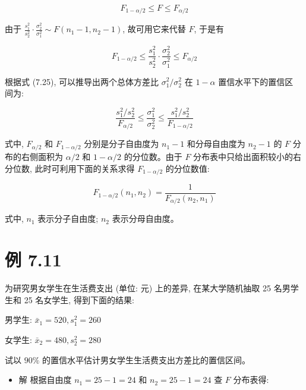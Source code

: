 \documentclass[10pt]{article}
\begin{document}
\begin{CJK*}{UTF8}{bsmi}
\begin{equation*}
F_{1-\alpha / 2} \leqslant F \leqslant F_{\alpha / 2} \tag{7.24}
\end{equation*}


由于 $\frac{s_{1}^{2}}{s_{2}^{2}} \cdot \frac{\sigma_{2}^{2}}{\sigma_{1}^{2}} \sim F\left(n_{1}-1, n_{2}-1\right)$, 故可用它来代替 $F$, 于是有


\begin{equation*}
F_{1-\alpha / 2} \leqslant \frac{s_{1}^{2}}{s_{2}^{2}} \cdot \frac{\sigma_{2}^{2}}{\sigma_{1}^{2}} \leqslant F_{\alpha / 2} \tag{7.25}
\end{equation*}


根据式 (7.25), 可以推导出两个总体方差比 $\sigma_{1}^{2} / \sigma_{2}^{2}$ 在 $1-\alpha$ 置信水平下的置信区\\
间为:


\begin{equation*}
\frac{s_{1}^{2} / s_{2}^{2}}{F_{\alpha / 2}} \leqslant \frac{\sigma_{1}^{2}}{\sigma_{2}^{2}} \leqslant \frac{s_{1}^{2} / s_{2}^{2}}{F_{1-\alpha / 2}} \tag{7.26}
\end{equation*}


式中, $F_{\alpha / 2}$ 和 $F_{1-\alpha / 2}$ 分别是分子自由度为 $n_{1}-1$ 和分母自由度为 $n_{2}-1$ 的 $F$ 分布的右侧面积为 $\alpha / 2$ 和 $1-\alpha / 2$ 的分位数。由于 $F$ 分布表中只给出面积较小的右分位数, 此时可利用下面的关系求得 $F_{1-\alpha / 2}$ 的分位数值:


\begin{equation*}
F_{1-\alpha / 2}\left(n_{1}, n_{2}\right)=\frac{1}{F_{\alpha / 2}\left(n_{2}, n_{1}\right)} \tag{7.27}
\end{equation*}


式中, $n_{1}$ 表示分子自由度; $n_{2}$ 表示分母自由度。

\section*{例 7.11}
为研究男女学生在生活费支出 (单位: 元) 上的差异, 在某大学随机抽取 25 名男学生和 25 名女学生, 得到下面的结果:

男学生: $\bar{x}_{1}=520, s_{1}^{2}=260$

女学生: $\bar{x}_{2}=480, s_{2}^{2}=280$

试以 $90 \%$ 的置信水平估计男女学生生活费支出方差比的置信区间。

\begin{itemize}
  \item 解 根据自由度 $n_{1}=25-1=24$ 和 $n_{2}=25-1=24$ 查 $F$ 分布表得:
\end{itemize}


\end{CJK*}
\end{document}
